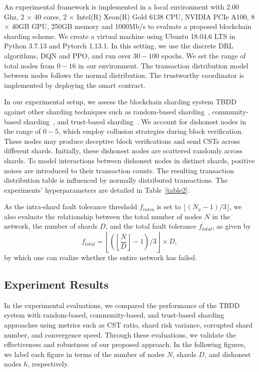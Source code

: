 An experimental framework is implemented in a local environment with 2.00 Ghz, 2 $\times$ 40 cores, 2 $\times$ Intel(R) Xeon(R) Gold 6138 CPU, NVIDIA PCIe A100, 8 $\times$ 40GB GPU, 250GB memory and 1000Mb/s to evaluate a proposed blockchain sharding scheme. We create a virtual machine using Ubuntu 18.04.6 LTS in Python 3.7.13 and Pytorch 1.13.1. In this setting, we use the discrete DRL algorithms, DQN and PPO, and run over $30-100$ epochs. We set the range of total nodes from $0-16$ in our environment. The transaction distribution model between nodes follows the normal distribution. The trustworthy coordinator is implemented by deploying the smart contract. 

In our experimental setup, we assess the blockchain sharding system \textsc{TBDD} against other sharding techniques such as random-based sharding~\cite{luu2016secure}, community-based sharding~\cite{zhang2022community}, and trust-based sharding~\cite{yun2019trust}. We account for dishonest nodes in the range of $0-5$, which employ collusion strategies during block verification. These nodes may produce deceptive block verifications and send CSTs across different shards. Initially, these dishonest nodes are scattered randomly across shards. To model interactions between dishonest nodes in distinct shards, positive noises are introduced to their transaction counts. The resulting transaction distribution table is influenced by normally distributed transactions. The experiments' hyperparameters are detailed in Table~\ref{table2}.

As the intra-shard fault tolerance threshold $f_{intra}$ is set to $\lfloor (N_x-1)/3\rfloor$, we also evaluate the relationship between the total number of nodes $N$ in the network, the number of shards $D$, and the total fault tolerance $f_{total}$, as given by
\begin{equation}
    \label{eq:24}
    f_{total} = \left \lfloor \left( \left\lfloor \frac{N}{D} \right\rfloor - 1 \right) / 3 \right\rfloor \times D,
\end{equation}
by which one can realize whether the entire network has failed.


\subsection{Experiment Results}
In the experimental evaluations, we compared the performance of the \textsc{TBDD} system with random-based, community-based, and trust-based sharding approaches using metrics such as CST ratio, shard risk variance, corrupted shard number, and convergence speed. Through these evaluations, we validate the effectiveness and robustness of our proposed approach. In the following figures, we label each figure in terms of the number of nodes $N$, shards $D$, and dishonest nodes $h$, respectively. 



